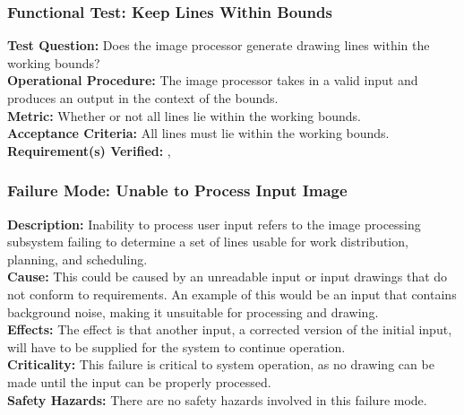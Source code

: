 \subsubsection{Functional Test: Keep Lines Within Bounds}
\label{test:image_ft_bounds}
\textbf{Test Question:} Does the image processor generate drawing lines within the working bounds?\\
\textbf{Operational Procedure:} The image processor takes in a valid input and produces an output in the context of the bounds. \\
\textbf{Metric:} Whether or not all lines lie within the working bounds.\\
\textbf{Acceptance Criteria:} All lines must lie within the working bounds.\\
\textbf{Requirement(s) Verified:} , 

\subsubsection{Failure Mode: Unable to Process Input Image}
\label{sec:image_fm_input}
\textbf{Description:} Inability to process user input refers to the image processing subsystem failing to determine a set of lines usable for work distribution, planning, and scheduling. \\
\textbf{Cause:} This could be caused by an unreadable input or input drawings that do not conform to requirements. An example of this would be an input that contains background noise, making it unsuitable for processing and drawing. \\
\textbf{Effects:} The effect is that another input, a corrected version of the initial input, will have to be supplied for the system to continue operation. \\
\textbf{Criticality:} This failure is critical to system operation, as no drawing can be made until the input can be properly processed. \\
\textbf{Safety Hazards:} There are no safety hazards involved in this failure mode.